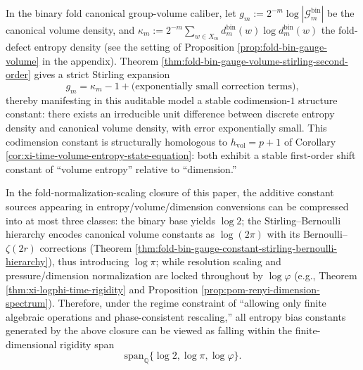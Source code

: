 \begin{remark}\label{rem:xi-stirling-codimension1}
In the binary fold canonical group-volume caliber, let
\(
g_m:=2^{-m}\log|\mathcal{G}^{\mathrm{bin}}_m|
\)
be the canonical volume density, and \(\kappa_m:=2^{-m}\sum_{w\in X_m} d_m^{\mathrm{bin}}(w)\log d_m^{\mathrm{bin}}(w)\) the fold-defect entropy density (see the setting of Proposition \ref{prop:fold-bin-gauge-volume} in the appendix).
Theorem \ref{thm:fold-bin-gauge-volume-stirling-second-order} gives a strict Stirling expansion
\[
g_m=\kappa_m-1+\text{(exponentially small correction terms)},
\]
thereby manifesting in this auditable model a stable codimension-\(1\) structure constant: there exists an irreducible unit difference between discrete entropy density and canonical volume density, with error exponentially small.
This codimension constant is structurally homologous to \(h_{\mathrm{vol}}=p+1\) of Corollary \ref{cor:xi-time-volume-entropy-state-equation}: both exhibit a stable first-order shift constant of ``volume entropy'' relative to ``dimension.''
\end{remark}

\begin{remark}\label{rem:xi-constant-source-span-log2-pi-phi}
In the fold-normalization-scaling closure of this paper, the additive constant sources appearing in entropy/volume/dimension conversions can be compressed into at most three classes: the binary base yields \(\log 2\); the Stirling--Bernoulli hierarchy encodes canonical volume constants as \(\log(2\pi)\) with its Bernoulli--\(\zeta(2r)\) corrections (Theorem \ref{thm:fold-bin-gauge-constant-stirling-bernoulli-hierarchy}), thus introducing \(\log\pi\);
while resolution scaling and pressure/dimension normalization are locked throughout by \(\log\varphi\) (e.g., Theorem \ref{thm:xi-logphi-time-rigidity} and Proposition \ref{prop:pom-renyi-dimension-spectrum}).
Therefore, under the regime constraint of ``allowing only finite algebraic operations and phase-consistent rescaling,'' all entropy bias constants generated by the above closure can be viewed as falling within the finite-dimensional rigidity span
\[
\mathrm{span}_{\mathbb Q}\{\log 2,\log\pi,\log\varphi\}.
\]
\end{remark}

